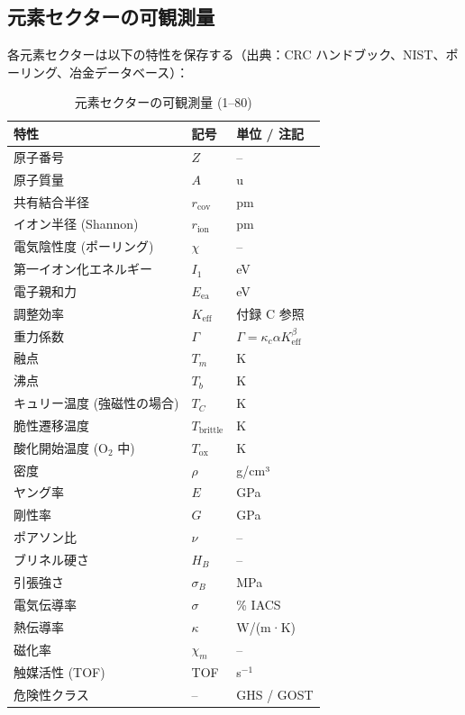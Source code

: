 \documentclass[11pt,a4paper]{article}
\newcommand{\Keff}{K_{\mathrm{eff}}}
\newcommand{\Gcoeff}{\Gamma}     %
\theoremstyle{remark}
\begin{document}
	\subsection{元素セクターの可観測量}
	
	各元素セクターは以下の特性を保存する（出典：CRC ハンドブック、NIST、ポーリング、冶金データベース）：
	
	\begin{longtable}{p{4cm} p{3cm} p{8cm}}
		\caption{元素セクターの可観測量 (1–80)} \\
		\toprule
		\textbf{特性} & \textbf{記号} & \textbf{単位 / 注記} \\
		\midrule
		原子番号 & \(Z\) & – \\
		原子質量 & \(A\) & u \\
		共有結合半径 & \(r_{\text{cov}}\) & pm \\
		イオン半径 (Shannon) & \(r_{\text{ion}}\) & pm \\
		電気陰性度 (ポーリング) & \(\chi\) & – \\
		第一イオン化エネルギー & \(I_1\) & eV \\
		電子親和力 & \(E_{\text{ea}}\) & eV \\
		調整効率 & \(\Keff\) & 付録 C 参照 \\
		重力係数 & \(\Gcoeff\) & \(\Gcoeff = \kappa_c \alpha \Keff^{\beta}\) \\
		融点 & \(T_m\) & K \\
		沸点 & \(T_b\) & K \\
		キュリー温度 (強磁性の場合) & \(T_C\) & K \\
		脆性遷移温度 & \(T_{\text{brittle}}\) & K \\
		酸化開始温度 (O\(_{2}\) 中) & \(T_{\text{ox}}\) & K \\
		密度 & \(\rho\) & g/cm³ \\
		ヤング率 & \(E\) & GPa \\
		剛性率 & \(G\) & GPa \\
		ポアソン比 & \(\nu\) & – \\
		ブリネル硬さ & \(H_B\) & – \\
		引張強さ & \(\sigma_B\) & MPa \\
		電気伝導率 & \(\sigma\) & \% IACS \\
		熱伝導率 & \(\kappa\) & W/(m·K) \\
		磁化率 & \(\chi_m\) & – \\
		触媒活性 (TOF) & TOF & s\(^{-1}\) \\
		危険性クラス & – & GHS / GOST \\
		\bottomrule
	\end{longtable}
	
\end{document}
